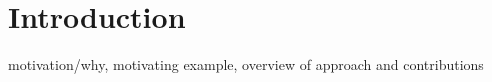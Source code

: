 \section{Introduction}
\label{sec:Introduction}

motivation/why, motivating example, overview of approach and contributions

\cite{Klare2021}
\cite{Atkinson2010}
\cite{Herrmannsdoerfer2011}